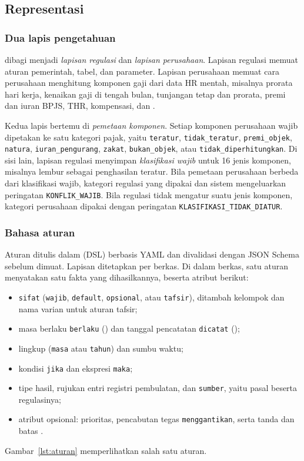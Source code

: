\subsection{Representasi }
\label{subsec:kb}

\subsubsection{Dua lapis pengetahuan}
 dibagi menjadi \emph{lapisan regulasi} dan \emph{lapisan perusahaan}. Lapisan regulasi memuat aturan pemerintah, tabel, dan parameter. Lapisan perusahaan memuat cara perusahaan menghitung komponen gaji dari data HR mentah, misalnya prorata hari kerja, kenaikan gaji di tengah bulan, tunjangan tetap dan prorata, premi dan iuran BPJS, THR, kompensasi, dan .

Kedua lapis bertemu di \emph{pemetaan komponen}. Setiap komponen perusahaan wajib dipetakan ke satu kategori pajak, yaitu \texttt{teratur}, \texttt{tidak\_teratur}, \texttt{premi\_objek}, \texttt{natura}, \texttt{iuran\_pengurang}, \texttt{zakat}, \texttt{bukan\_objek}, atau \texttt{tidak\_diperhitungkan}. Di sisi lain, lapisan regulasi menyimpan \emph{klasifikasi wajib} untuk 16 jenis komponen, misalnya lembur sebagai penghasilan teratur. Bila pemetaan perusahaan berbeda dari klasifikasi wajib, kategori regulasi yang dipakai dan sistem mengeluarkan peringatan \texttt{KONFLIK\_WAJIB}. Bila regulasi tidak mengatur suatu jenis komponen, kategori perusahaan dipakai dengan peringatan \texttt{KLASIFIKASI\_TIDAK\_DIATUR}.

\subsubsection{Bahasa aturan}
Aturan ditulis dalam  (DSL) berbasis YAML dan divalidasi dengan JSON Schema sebelum dimuat. Lapisan ditetapkan per berkas. Di dalam berkas, satu aturan menyatakan satu fakta yang dihasilkannya, beserta atribut berikut:
\begin{itemize}[leftmargin=*,nosep]
  \item \texttt{sifat} (\texttt{wajib}, \texttt{default}, \texttt{opsional}, atau \texttt{tafsir}), ditambah kelompok dan nama varian untuk aturan tafsir;
  \item masa berlaku \texttt{berlaku} () dan tanggal pencatatan \texttt{dicatat} ();
  \item lingkup (\texttt{masa} atau \texttt{tahun}) dan sumbu waktu;
  \item kondisi \texttt{jika} dan ekspresi \texttt{maka};
  \item tipe hasil, rujukan entri registri pembulatan, dan \texttt{sumber}, yaitu pasal beserta regulasinya;
  \item atribut opsional: prioritas, pencabutan tegas \texttt{menggantikan}, serta tanda dan batas .
\end{itemize}
Gambar~\ref{lst:aturan} memperlihatkan salah satu aturan.

